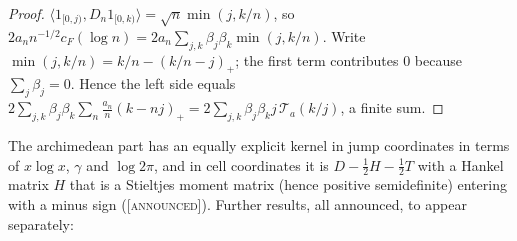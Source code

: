 \documentclass[11pt]{amsart}
\theoremstyle{definition}
\theoremstyle{remark}
\numberwithin{equation}{section}
\newcommand{\cF}{c_F}                                  %
\newcommand{\stag}[1]{\textsc{[#1]}}
\newcommand{\ANNOUNCED}{\stag{announced}}
\begin{document}
\begin{proof}
$\langle1_{[0,j)},D_n1_{[0,k)}\rangle=\sqrt n\min(j,k/n)$, so $2a_nn^{-1/2}\cF(\log n)=2a_n\sum_{j,k}\beta_j\beta_k\min(j,k/n)$. Write
$\min(j,k/n)=k/n-(k/n-j)_+$; the first term contributes $0$ because $\sum_j\beta_j=0$. Hence the left side equals
$2\sum_{j,k}\beta_j\beta_k\sum_n\frac{a_n}n(k-nj)_+=2\sum_{j,k}\beta_j\beta_kj\,\mathcal T_a(k/j)$, a finite sum.
\end{proof}

The archimedean part has an equally explicit kernel in jump coordinates in terms of $x\log x$, $\gamma$ and $\log2\pi$, and in cell coordinates
it is $D-\frac12H-\frac12T$ with a Hankel matrix $H$ that is a Stieltjes moment matrix (hence positive semidefinite) entering with a minus sign
(\ANNOUNCED). Further results, all announced, to appear separately:
\end{document}
